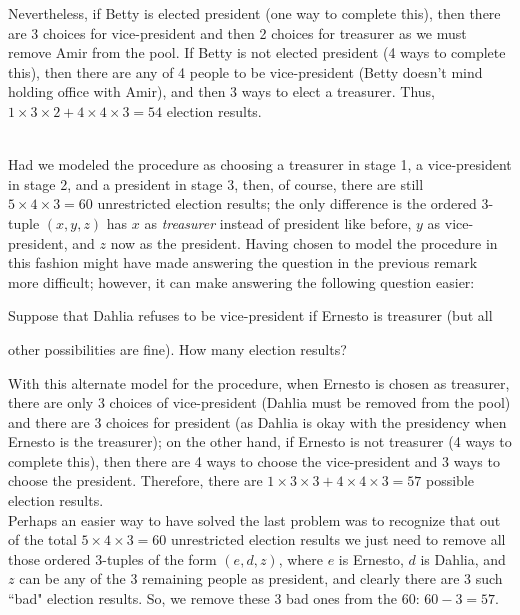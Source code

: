 \documentclass[12pt]{article}
\begin{document}
\noindent Nevertheless, if Betty is elected president (one way to complete this), then there are 3 choices for vice-president and then 2 choices for treasurer as we must remove Amir from the pool.  If Betty is not elected president (4 ways to complete this), then there are any of 4 people to be vice-president (Betty doesn't mind holding office with Amir), and then 3 ways to elect a treasurer. Thus, $1\times 3\times 2 + 4\times 4\times 3 = 54$ election results.\\




\newpage





\\
Had we modeled the procedure as choosing a treasurer in stage 1, a vice-president in stage 2, and a president in stage 3, then, of course, there are still $5\times 4\times 3=60$ unrestricted election results; the only difference is the ordered 3-tuple $(x,y,z)$ has $x$ as {\em treasurer} instead of president like before, $y$ as vice-president, and $z$ now as the president.  Having chosen to model the procedure in this fashion might have made answering the question in the previous remark more difficult; however, it can make answering the following question easier:

Suppose that Dahlia refuses to be vice-president if Ernesto is treasurer (but all

other possibilities are fine). How many election results?

\noindent With this alternate model for the procedure, when Ernesto is chosen as treasurer, there are only 3 choices of vice-president (Dahlia must be removed from the pool) and there are 3 choices for president (as Dahlia is okay with the presidency when Ernesto is the treasurer); on the other hand, if Ernesto is not treasurer (4 ways to complete this), then there are 4 ways to choose the
vice-president and 3 ways to choose the president.  Therefore,
there are $1\times 3\times 3 + 4\times 4\times 3 = 57$ possible election results.\\

\noindent Perhaps an easier way to have solved the last problem was to recognize that out of the total
$5\times 4\times 3 = 60$ unrestricted election results we just need to remove
all those ordered 3-tuples of the form $(e,d,z)$, where $e$ is Ernesto, $d$ is Dahlia, and $z$ can be any of the 3 remaining people as president, and clearly there are 3 such ``bad" election results. So, we remove these 3 bad ones from the 60: $60-3=57$.\\
\end{document}
